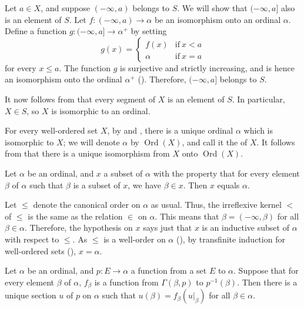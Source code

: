 \documentclass{article}
\begin{document}
Let \(a \in X\), and suppose \((-\infty, a)\) belongs to \(S\).  We
will show that \((-\infty, a]\) also is an element of \(S\).  Let
\(f : (-\infty, a) \to \alpha\) be an isomorphism onto an ordinal
\(\alpha\).  Define a function \(g : (-\infty, a] \to \alpha^+\) by
setting
\begin{displaymath}
  g(x) =
  \begin{cases}
    f(x) & \text{if} ~ x < a \\
    \alpha & \text{if} ~ x = a
  \end{cases}
\end{displaymath}
for every \(x \leq a\).  The function \(g\) is surjective and strictly
increasing, and is hence an isomorphism onto the ordinal \(\alpha^+\)
().  Therefore, \((-\infty, a]\) belongs to \(S\).

It now follows from  that every segment of \(X\) is
an element of \(S\).  In particular, \(X \in S\), so \(X\) is
isomorphic to an ordinal.

For every well-ordered set \(X\), by  and
, there is a unique ordinal \(\alpha\) which is
isomorphic to \(X\); we will denote \(\alpha\) by
\(\operatorname{Ord}(X)\), and call it the  of
\(X\).  It follows from  that there is a unique
isomorphism from \(X\) onto \(\operatorname{Ord}(X)\).

\begin{theorem}
  \label{thm:6ehprsvw}
  Let \(\alpha\) be an ordinal, and \(x\) a subset of \(\alpha\) with
  the property that for every element \(\beta\) of \(\alpha\) such
  that \(\beta\) is a subset of \(x\), we have \(\beta \in x\).  Then
  \(x\) equals \(\alpha\).
\end{theorem}

Let \(\leq\) denote the canonical order on \(\alpha\) as usual.  Thus,
the irreflexive kernel \(<\) of \(\leq\) is the same as the relation
\(\in\) on \(\alpha\).  This means that \(\beta = (-\infty, \beta)\)
for all \(\beta \in \alpha\).  Therefore, the hypothesis on \(x\) says
just that \(x\) is an inductive subset of \(\alpha\) with respect to
\(\leq\).  As \(\leq\) is a well-order on \(\alpha\)
(), by transfinite induction for well-ordered sets
(), \(x = \alpha\).

\begin{theorem}
  \label{thm:fa9kx7s9}
  Let \(\alpha\) be an ordinal, and \(p : E \to \alpha\) a function
  from a set \(E\) to \(\alpha\).  Suppose that for every element
  \(\beta\) of \(\alpha\), \(f_\beta\) is a function from
  \(\Gamma(\beta, p)\) to \(p^{-1}(\beta)\).  Then there is a unique
  section \(u\) of \(p\) on \(\alpha\) such that
  \(u(\beta) = f_\beta(u \vert_\beta)\) for all \(\beta \in \alpha\).
\end{theorem}
\end{document}
